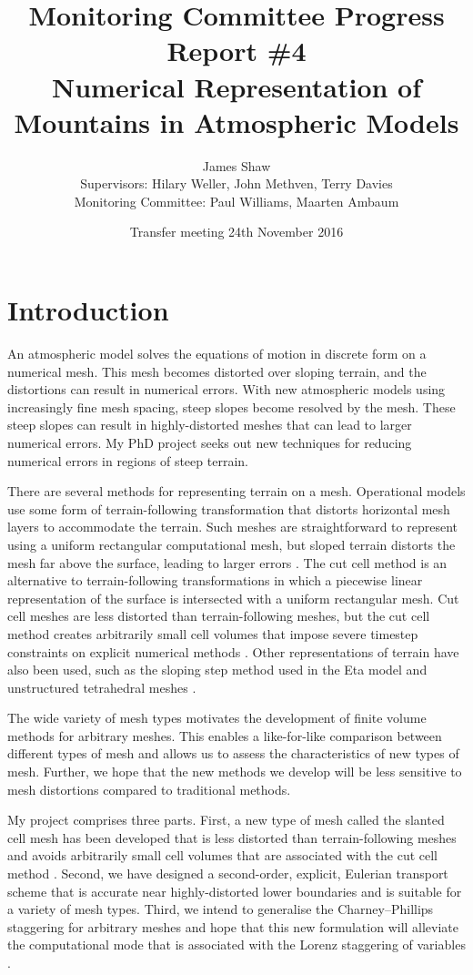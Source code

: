 \documentclass[a4paper,11pt]{article}
\title{
\vspace*{-2em}
Monitoring Committee Progress Report \#4\\
\vspace*{1em}
\Large{Numerical Representation of Mountains in Atmospheric Models}}
\author{James Shaw
\vspace{0.5em} \\
\large{Supervisors: Hilary Weller, John Methven, Terry Davies}
\vspace{0.5em} \\
\large{Monitoring Committee: Paul Williams, Maarten Ambaum}}
\date{Transfer meeting 24th November 2016}
\begin{document}
\maketitle

\section{Introduction}

An atmospheric model solves the equations of motion in discrete form on a numerical mesh.  This mesh becomes distorted over sloping terrain, and the distortions can result in numerical errors.  With new atmospheric models using increasingly fine mesh spacing, steep slopes become resolved by the mesh.  These steep slopes can result in highly-distorted meshes that can lead to larger numerical errors.  My PhD project seeks out new techniques for reducing numerical errors in regions of steep terrain.

There are several methods for representing terrain on a mesh.  Operational models use some form of terrain-following transformation that distorts horizontal mesh layers to accommodate the terrain.  Such meshes are straightforward to represent using a uniform rectangular computational mesh, but sloped terrain distorts the mesh far above the surface, leading to larger errors \citep{schaer2002,klemp2011}.  The cut cell method is an alternative to terrain-following transformations in which a piecewise linear representation of the surface is intersected with a uniform rectangular mesh.  Cut cell meshes are less distorted than terrain-following meshes, but the cut cell method creates arbitrarily small cell volumes that impose severe timestep constraints on explicit numerical methods \citep{klein2009}.  Other representations of terrain have also been used, such as the sloping step method used in the Eta model \citep{mesinger2012} and unstructured tetrahedral meshes \citep{smolarkiewicz-szmelter2011}.

The wide variety of mesh types motivates the development of finite volume methods for arbitrary meshes.  This enables a like-for-like comparison between different types of mesh and allows us to assess the characteristics of new types of mesh.  Further, we hope that the new methods we develop will be less sensitive to mesh distortions compared to traditional methods.

My project comprises three parts.  First, a new type of mesh called the slanted cell mesh has been developed that is less distorted than terrain-following meshes and avoids arbitrarily small cell volumes that are associated with the cut cell method \citep{shaw-weller2016}.  Second, we have designed a second-order, explicit, Eulerian transport scheme that is accurate near highly-distorted lower boundaries and is suitable for a variety of mesh types.  Third, we intend to generalise the Charney--Phillips staggering for arbitrary meshes and hope that this new formulation will alleviate the computational mode that is associated with the Lorenz staggering of variables \citep{arakawa-konor1996}.
\end{document}
